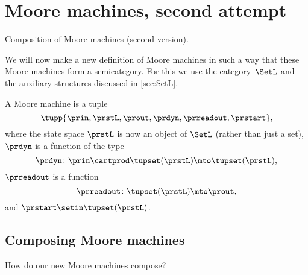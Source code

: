 
\section{Moore machines, second attempt}
\label{sec:moore-semicategorically}

\begin{marginfigure}
    \centering
    \caption{Composition of Moore machines (second version).}
    \label{fig:comp_moore_2}
\end{marginfigure}

We will now make a new definition of Moore machines in such a way that these Moore machines form a semicategory.
For this we use the category~$\SetL$ and the auxiliary structures discussed in \cref{sec:SetL}.

\begin{definition}
    \label{def:moore_machine}
    A Moore machine is a tuple
    \begin{equation}
        \label{eq:moore-tuple-improved}
        \tupp{\prin,\prstL,\prout,\prdyn,\prreadout,\prstart},
    \end{equation}
    where the state space $\prstL$ is now an object of $\SetL$ (rather than just a set), $\prdyn$ is a function of the type
    \begin{equation}
        \prdyn \colon \prin \cartprod \tupset(\prstL) \mto \tupset(\prstL),
    \end{equation}
    $\prreadout$ is a function
    \begin{equation}
        \prreadout \colon \tupset(\prstL) \mto \prout,
    \end{equation}
    and $\prstart \setin \tupset(\prstL)$.
\end{definition}

\subsection{Composing Moore machines}
\label{sec:composing-moore-machines}

How do our new Moore machines compose?

